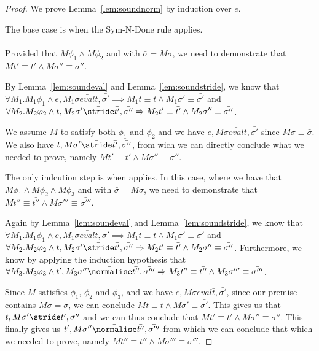 \begin{proof}
  We prove Lemma~\ref{lem:soundnorm} by induction over $e$.

  The base case is when the Sym-N-Done rule applies.\\
  \\

  Provided that $M\phi_1\land M\phi_2$ and  with $\bar{\sigma}=M\sigma$,
  we need to demonstrate that $M t'\equiv \bar{t'}\land M\sigma''\equiv \bar{\sigma''}$.

  By Lemma~\ref{lem:soundeval} and Lemma~\ref{lem:soundstride},
  we know that
  $\forall M_1. M_1\phi_1 \land e,M_1\sigma \bar{eval}\bar{t},\bar{\sigma'}\implies M_1 t \equiv \bar{t} \land M_1 \sigma'\equiv \bar{\sigma'}$ and
  $\forall M_2.M_2\phi_2\land t,M_2\sigma'\bar{\stride}\bar{t'},\bar{\sigma''}\implies M_2 t'\equiv\bar{t'}\land M_2\sigma''\equiv \bar{\sigma''}$.

  We assume $M$ to satisfy both $\phi_1$ and $\phi_2$ and we have $e,M\sigma \bar{eval}\bar{t},\bar{\sigma'}$ since $M\sigma\equiv \bar{\sigma}$.
  We also have $t,M\sigma'\bar{\stride}\bar{t'},\bar{\sigma''}$,
  from wich we can directly conclude what we needed to prove,
  namely $M t'\equiv \bar{t'}\land M\sigma''\equiv \bar{\sigma''}$.

  The only indcution step is when  applies.
  In this case, where we have that $M\phi_1\land M\phi_2 \land M\phi_3$ and  with $\bar{\sigma}=M\sigma$,
  we need to demonstrate that $M t''\equiv \bar{t''}\land M\sigma'''\equiv \bar{\sigma'''}$.

  Again by Lemma~\ref{lem:soundeval} and Lemma~\ref{lem:soundstride},
  we know that
  $\forall M_1. M_1\phi_1 \land e,M_1\sigma \bar{eval}\bar{t},\bar{\sigma'}\implies M_1 t \equiv \bar{t} \land M_1 \sigma'\equiv \bar{\sigma'}$ and
  $\forall M_2.M_2\phi_2\land t,M_2\sigma'\bar{\stride}\bar{t'},\bar{\sigma''}\implies M_2 t'\equiv\bar{t'}\land M_2\sigma''\equiv \bar{\sigma''}$.
  Furthermore, we know by applying the induction hypothesis that $\forall M_3.M_3\phi_3 \land t',M_3\sigma''\bar{\normalise} \bar{t''},\bar{\sigma'''}\implies M_3 t''\equiv \bar{t''}\land M_3 \sigma'''\equiv \bar{\sigma'''}$.

  Since $M$ satisfies $\phi_1$, $\phi_2$ and $\phi_3$, and we have $e,M\sigma \bar{eval}\bar{t},\bar{\sigma'}$, since our premise contains $M\sigma = \bar{\sigma}$, we can conclude $M t \equiv \bar{t} \land M \sigma'\equiv \bar{\sigma'}$.
  This gives us that $t,M\sigma'\bar{\stride}\bar{t'},\bar{\sigma''}$ and we can thus conclude that $M t'\equiv\bar{t'}\land M\sigma''\equiv \bar{\sigma''}$.
  This finally gives us $t',M\sigma''\bar{\normalise} \bar{t''},\bar{\sigma'''}$ from which we can conclude that which we needed to prove,
  namely $M t''\equiv \bar{t''}\land M\sigma'''\equiv \bar{\sigma'''}$.
\end{proof}

